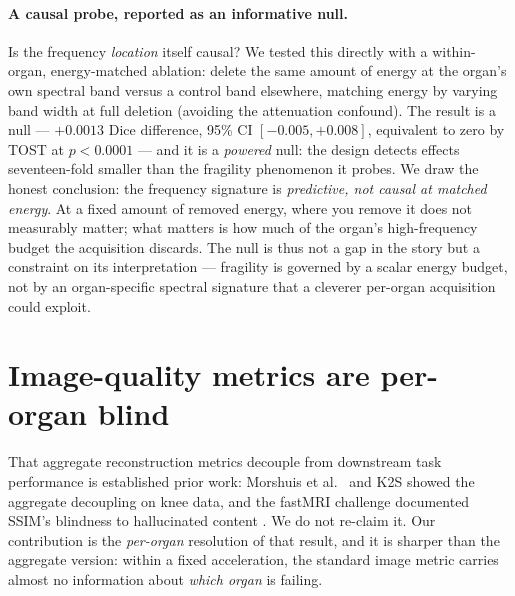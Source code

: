 \documentclass[10pt,twocolumn,letterpaper]{article}
\begin{document}
\paragraph{A causal probe, reported as an informative null.}
Is the frequency \emph{location} itself causal? We tested this directly with a within-organ, energy-matched ablation: delete the same amount of energy at the organ's own spectral band versus a control band elsewhere, matching energy by varying band width at full deletion (avoiding the attenuation confound). The result is a null --- $+0.0013$ Dice difference, 95\% CI $[-0.005, +0.008]$, equivalent to zero by TOST at $p<0.0001$ --- and it is a \emph{powered} null: the design detects effects seventeen-fold smaller than the fragility phenomenon it probes. We draw the honest conclusion: the frequency signature is \emph{predictive, not causal at matched energy}. At a fixed amount of removed energy, where you remove it does not measurably matter; what matters is how much of the organ's high-frequency budget the acquisition discards. The null is thus not a gap in the story but a constraint on its interpretation --- fragility is governed by a scalar energy budget, not by an organ-specific spectral signature that a cleverer per-organ acquisition could exploit.

\section{Image-quality metrics are per-organ blind}
\label{sec:metricblind}

That aggregate reconstruction metrics decouple from downstream task performance is established prior work: Morshuis et al.\ \cite{morshuis2025} and K2S \cite{tolpadi2023} showed the aggregate decoupling on knee data, and the fastMRI challenge documented SSIM's blindness to hallucinated content \cite{muckley2021}. We do not re-claim it. Our contribution is the \emph{per-organ} resolution of that result, and it is sharper than the aggregate version: within a fixed acceleration, the standard image metric carries almost no information about \emph{which organ} is failing.
\end{document}
